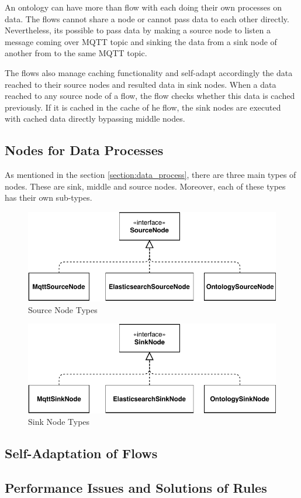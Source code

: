 An ontology can have more than flow with each doing their own processes on data. The flows cannot share a node or cannot pass data to each other directly. Nevertheless, its possible to pass data by making a source node to listen a message coming over MQTT topic and sinking the data from a sink node of another from to the same MQTT topic.

The flows also manage caching functionality and self-adapt accordingly the data reached to their source nodes and resulted data in sink nodes. When a data reached to any source node of a flow, the flow checks whether this data is cached previously. If it is cached in the cache of he flow, the sink nodes are executed with cached data directly bypassing middle nodes. 

\subsection{Nodes for Data Processes}

As mentioned in the section \ref{section:data_process}, there are three main types of nodes. These are sink, middle and source nodes. Moreover, each of these types has their own sub-types.
\begin{figure}[H]
  \centering
  \includegraphics[width=\textwidth,height=\textheight,keepaspectratio]{figures/source_nodes.pdf}
  \caption[Source Node Types]{Source Node Types}\label{fig:source_nodes}
\end{figure}
\begin{figure}[H]
  \centering
  \includegraphics[width=\textwidth,height=\textheight,keepaspectratio]{figures/sink_nodes.pdf}
  \caption[Sink Node Types]{Sink Node Types}\label{fig:sink_nodes}
\end{figure}

\subsection{Self-Adaptation of Flows}

\subsection{Performance Issues and Solutions of Rules}

